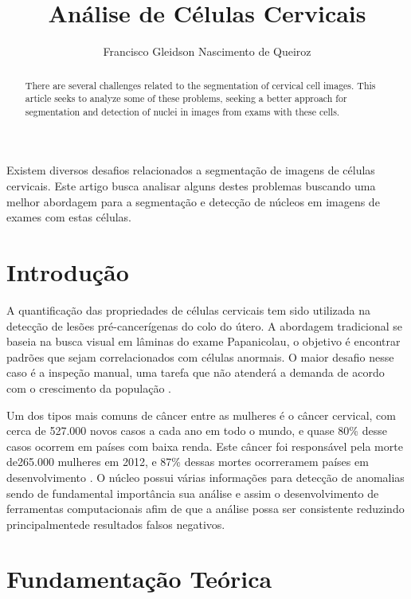 \documentclass[12pt]{article}
\title{Análise de Células Cervicais}
\author{Francisco Gleidson Nascimento de Queiroz\inst{1} }
\begin{document}
 

\maketitle

\begin{abstract}
  There are several challenges related to the segmentation of cervical cell images. This article seeks to analyze some of these problems, seeking a better approach for segmentation and detection of nuclei in images from exams with these cells.
\end{abstract}
     
\begin{resumo} 
  Existem diversos desafios relacionados a segmentação de imagens de células cervicais. Este artigo busca analisar alguns destes problemas buscando uma melhor abordagem para a segmentação e detecção de núcleos em imagens de exames com estas células.
\end{resumo}


\section{Introdução}

A quantiﬁcação das propriedades de células cervicais tem sido utilizada na detecção de lesões pré-cancerígenas do colo do útero. A abordagem tradicional se baseia na busca visual em lâminas do exame Papanicolau, o objetivo é encontrar padrões que sejam correlacionados com células anormais. O maior desaﬁo nesse caso é a inspeção manual, uma tarefa que não atenderá a demanda de acordo com o crescimento da população \cite{silva2018detecccao}.

Um dos tipos mais comuns de câncer entre as mulheres é o  câncer cervical, com cerca de 527.000 novos casos a cada ano  em todo o mundo, e quase 80\% desse casos ocorrem em países com baixa renda. Este câncer foi responsável pela morte de265.000 mulheres em 2012, e 87\% dessas mortes ocorreramem países em desenvolvimento \cite{ramalho2015cell}. O núcleo possui várias informações para detecção de anomalias sendo de fundamental importância sua análise e assim o desenvolvimento de ferramentas computacionais  afim de que a análise possa ser consistente reduzindo principalmentede resultados falsos negativos.

\section{Fundamentação Teórica} \label{sec:firstpage}
\end{document}
